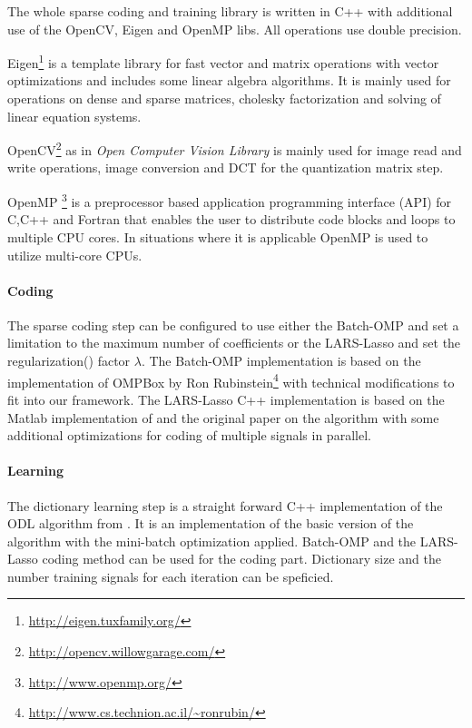The whole sparse coding and training library is written in C++ with
additional use of the OpenCV, Eigen and OpenMP libs. All operations use double
precision. 

Eigen\footnote{\url{http://eigen.tuxfamily.org/}}
is a template library for fast vector and matrix operations with vector
optimizations and includes some linear algebra algorithms. It is mainly used for
operations on dense and sparse matrices, cholesky factorization and solving of
linear equation systems. 

OpenCV\footnote{\url{http://opencv.willowgarage.com/}} as
in \emph{Open Computer Vision Library} is mainly used for
image read and write operations, image conversion and DCT for the
quantization matrix step. 

OpenMP \footnote{\url{http://www.openmp.org/}} is a preprocessor
based application programming interface (API) for C,C++ and Fortran that enables
the user to distribute code blocks and loops to multiple CPU cores. In
situations where it is applicable OpenMP is used to utilize multi-core CPUs. 



\paragraph{Coding}
The sparse coding step can be configured to use either the Batch-OMP and 
set a limitation to the maximum number of coefficients or the LARS-Lasso 
and set the regularization() factor $\lambda$.
The Batch-OMP implementation is based on the implementation
of OMPBox by Ron
 Rubinstein\footnote{\url{http://www.cs.technion.ac.il/~ronrubin/}} with
technical modifications to fit into our
framework. The LARS-Lasso C++ implementation is based on the Matlab
implementation of\cite{Strand2005} and the original
paper\cite{Efron2004} on the algorithm with some additional optimizations
for coding of multiple signals in parallel. 

\paragraph{Learning}
The dictionary learning step is a straight forward C++ implementation of the
ODL algorithm from . It is an
implementation of the
basic version of the algorithm with the mini-batch optimization applied.
Batch-OMP and the LARS-Lasso coding method can be used for the coding part.
Dictionary size and the number training signals for each iteration can be
speficied.

